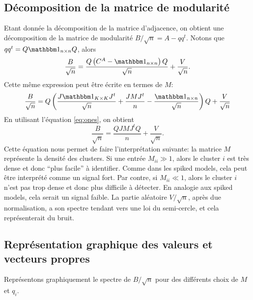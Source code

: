 \documentclass[../../main.tex]{subfiles} %
\begin{document}
\subsection{Décomposition de la matrice de modularité} 
Etant donnée la décomposition de la matrice d'adjacence, on obtient une 
décomposition de la matrice de modularité $B/ \sqrt n = A - q q^t$. Notons que 
$q q^t = Q \ones{n \times n} Q$, alors
\begin{equation*}
	\frac{B}{\sqrt n} = \frac{Q \left( C^A - \ones{n \times n}\right) Q}
	{\sqrt n} + \frac{V}{\sqrt n}.
\end{equation*}
Cette même expression peut être écrite en termes de $M$:
\begin{equation*}
	\frac{B}{\sqrt n} = Q \left( \frac{J \ones{K \times K} J^t}{\sqrt n} 
	+ \frac{J M J^t}{n} - \frac{\ones{n \times n}}{\sqrt n} \right) Q 
	+ \frac{V}{\sqrt n}
\end{equation*}
En utilisant l'équation \ref{eq:ones}, on obtient
\begin{equation}
	\frac{B}{\sqrt n} = \frac{Q J M J^t Q}{n} + \frac{V}{\sqrt n}.
	\label{eq:B}
\end{equation}
Cette équation nous permet de faire l'interprétation suivante: la matrice $M$ 
représente la densité des clusters. Si une entrée $M_{ii} \gg 1$, alors le 
cluster $i$ est très dense et donc ``plus facile'' à identifier. Comme dans les
spiked models, cela peut être interprété comme un signal fort. Par contre, si 
$M_{ii} \ll 1$, alors le cluster $i$ n'est pas trop dense et donc plus difficile 
à détecter. En analogie aux spiked models, cela serait un signal faible. La 
partie aléatoire $V/\sqrt n$, après due normalisation, a son spectre tendant 
vers une loi du semi-cercle, et cela représenterait du bruit.

\subsection{Représentation graphique des valeurs et vecteurs propres}
Représentons graphiquement le spectre de $B / \sqrt n$ pour des différents 
choix de $M$ et $q_i$.
\end{document}
